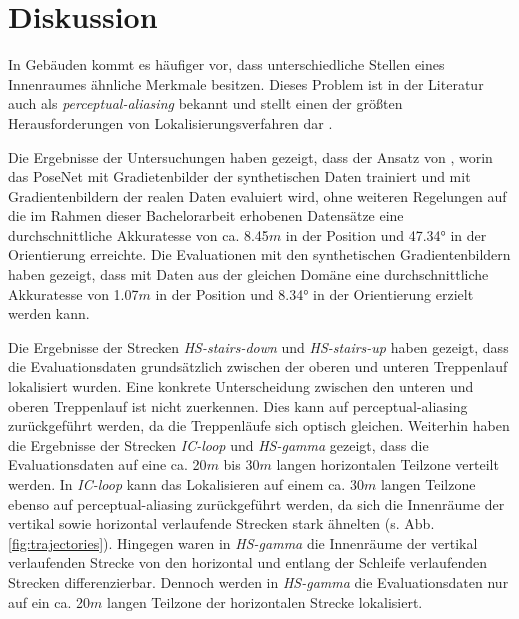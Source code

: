 
\section{Diskussion}
\label{sec:kapitel_5}

In Gebäuden kommt es häufiger vor, dass unterschiedliche Stellen eines Innenraumes ähnliche Merkmale besitzen. Dieses Problem ist in der Literatur auch als \textit{perceptual-aliasing} bekannt und stellt einen der größten Herausforderungen von Lokalisierungsverfahren dar \cite{lowryVisualPlaceRecognition2016}.

Die Ergebnisse der Untersuchungen haben gezeigt, dass der Ansatz von \citet{acharyaBIMPoseNetIndoorCamera2019}, worin das PoseNet mit Gradietenbilder der synthetischen Daten trainiert und mit Gradientenbildern der realen Daten evaluiert wird, ohne weiteren Regelungen auf die im Rahmen dieser Bachelorarbeit erhobenen Datensätze eine durchschnittliche Akkuratesse von ca. 8.45$m$ in der Position und 47.34° in der Orientierung erreichte. Die Evaluationen mit den synthetischen Gradientenbildern haben gezeigt, dass mit Daten aus der gleichen Domäne eine durchschnittliche Akkuratesse von 1.07$m$ in der Position und 8.34° in der Orientierung erzielt werden kann. 



Die Ergebnisse der Strecken \textit{HS-stairs-down} und \textit{HS-stairs-up} haben gezeigt, dass die Evaluationsdaten grundsätzlich zwischen der oberen und unteren Treppenlauf lokalisiert wurden. Eine konkrete Unterscheidung zwischen den unteren und oberen Treppenlauf ist nicht zuerkennen. Dies kann auf perceptual-aliasing zurückgeführt werden, da die Treppenläufe sich optisch gleichen. Weiterhin haben die Ergebnisse der Strecken \textit{IC-loop} und \textit{HS-gamma} gezeigt, dass die Evaluationsdaten auf eine ca. 20$m$ bis 30$m$ langen horizontalen Teilzone verteilt werden. In \textit{IC-loop} kann das Lokalisieren auf einem ca. 30$m$ langen Teilzone ebenso auf perceptual-aliasing zurückgeführt werden, da sich die Innenräume der vertikal sowie horizontal verlaufende Strecken stark ähnelten (s. Abb. \ref{fig:trajectories}). Hingegen waren in \textit{HS-gamma} die Innenräume der vertikal verlaufenden Strecke von den horizontal und entlang der Schleife verlaufenden Strecken differenzierbar. Dennoch werden in \textit{HS-gamma} die Evaluationsdaten nur auf ein ca. 20$m$ langen Teilzone der horizontalen Strecke lokalisiert.




